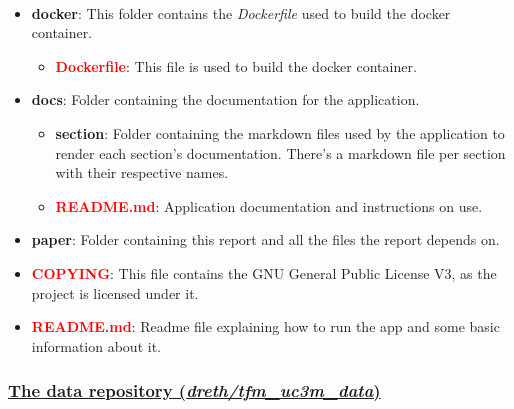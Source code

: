 \documentclass[
  a4paper]{article}
\providecommand{\tightlist}{%
  \setlength{\itemsep}{0pt}\setlength{\parskip}{0pt}}
\begin{document}
~

\begin{itemize}
\item
  \textcolor{darkspringgreen}{\textbf{docker}}: This folder contains the
  \emph{Dockerfile} used to build the docker container.

  \begin{itemize}
  \tightlist
  \item
    \textcolor{red}{\textbf{Dockerfile}}: This file is used to build the
    docker container.
  \end{itemize}
\item
  \textcolor{darkspringgreen}{\textbf{docs}}: Folder containing the
  documentation for the application.

  \begin{itemize}
  \tightlist
  \item
    \textcolor{darkspringgreen}{\textbf{section}}: Folder containing the
    markdown files used by the application to render each section's
    documentation. There's a markdown file per section with their
    respective names.
  \item
    \textcolor{red}{\textbf{README.md}}: Application documentation and
    instructions on use.
  \end{itemize}
\item
  \textcolor{darkspringgreen}{\textbf{paper}}: Folder containing this
  report and all the files the report depends on.
\item
  \textcolor{red}{\textbf{COPYING}}: This file contains the GNU General
  Public License V3, as the project is licensed under it.
\item
  \textcolor{red}{\textbf{README.md}}: Readme file explaining how to run
  the app and some basic information about it.
\end{itemize}

\hypertarget{the-data-repository-drethtfm_uc3m_data}{%
\subsubsection{\texorpdfstring{\href{https://github.com/dreth/tfm_c3m_data}{\textbf{The
data repository}
(\emph{dreth/tfm\_uc3m\_data})}}{The data repository (dreth/tfm\_uc3m\_data)}}\label{the-data-repository-drethtfm_uc3m_data}}
\end{document}
